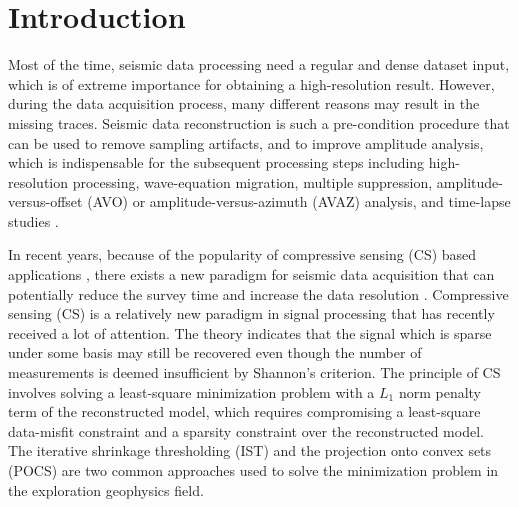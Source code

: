 \section{Introduction}

Most of the time, seismic data processing need a regular and dense dataset input, which is of extreme importance for obtaining a high-resolution result.  However, during the data acquisition process, many different reasons may result in the missing traces. Seismic data reconstruction is such a pre-condition procedure that can be used to remove sampling artifacts, and to improve amplitude analysis, which is indispensable for the subsequent processing steps including high-resolution processing, wave-equation migration, multiple suppression, amplitude-versus-offset (AVO) or amplitude-versus-azimuth (AVAZ) analysis, and time-lapse studies \cite[]{daniel2002,liubin2004,abma2005,abma2006,juefu2010,mostafa2010,yangkang2014halfthr,yangkang2015eage2}. 

In recent years, because of the popularity of compressive sensing (CS) based applications \cite[]{candes20062}, there exists a new paradigm for seismic data acquisition that can potentially reduce the survey time and increase the data resolution \cite[]{herrmann2010}. Compressive sensing (CS) is a relatively new paradigm in signal processing that has recently received a lot of attention. The theory indicates that the signal which is sparse under some basis may still be recovered even though the number of measurements is deemed insufficient by Shannon's criterion. The principle of CS involves solving a least-square minimization problem with a $L_1$ norm penalty term of the reconstructed model, which requires compromising a least-square data-misfit constraint and a sparsity constraint over the reconstructed model. The iterative shrinkage thresholding (IST) and the projection onto convex sets (POCS) are two common approaches used to solve the minimization problem in the exploration geophysics field. 

